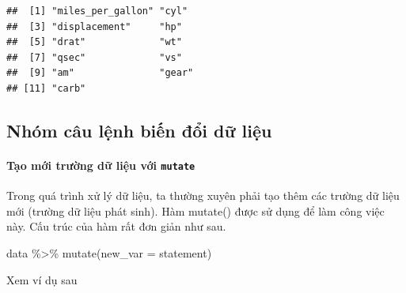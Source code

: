 \documentclass[]{krantz}
\makeatletter
\newenvironment{Shaded}{\begin{snugshade}}{\end{snugshade}}
\newcommand{\DataTypeTok}[1]{\textcolor[rgb]{0.27,0.27,0.27}{#1}}
\newcommand{\DecValTok}[1]{\textcolor[rgb]{0.06,0.06,0.06}{#1}}
\newcommand{\KeywordTok}[1]{\textcolor[rgb]{0.27,0.27,0.27}{\textbf{#1}}}
\newcommand{\NormalTok}[1]{#1}
\newcommand{\OperatorTok}[1]{\textcolor[rgb]{0.43,0.43,0.43}{\textbf{#1}}}
\newcommand{\StringTok}[1]{\textcolor[rgb]{0.5,0.5,0.5}{#1}}
\let\oldparagraph\paragraph
\renewcommand{\paragraph}[1]{\oldparagraph{#1}\mbox{}}
\renewenvironment{quote}{\begin{VF}}{\end{VF}}
\newenvironment{kframe}{%
\medskip{}
\setlength{\fboxsep}{.8em}
 \def\at@end@of@kframe{}%
 \ifinner\ifhmode%
  \def\at@end@of@kframe{\end{minipage}}%
  \begin{minipage}{\columnwidth}%
 \fi\fi%
 \def\FrameCommand##1{\hskip\@totalleftmargin \hskip-\fboxsep
 \colorbox{shadecolor}{##1}\hskip-\fboxsep
     \hskip-\linewidth \hskip-\@totalleftmargin \hskip\columnwidth}%
 \MakeFramed {\advance\hsize-\width
   \@totalleftmargin\z@ \linewidth\hsize
   \@setminipage}}%
 {\par\unskip\endMakeFramed%
 \at@end@of@kframe}
\renewenvironment{Shaded}{\begin{kframe}}{\end{kframe}}
\renewenvironment{Shaded}{\begin{snugshade}}{\end{snugshade}}
\renewcommand{\DataTypeTok}[1]{\textcolor[rgb]{0.13,0.29,0.53}{#1}}
\renewcommand{\DecValTok}[1]{\textcolor[rgb]{0.00,0.00,0.81}{#1}}
\renewcommand{\KeywordTok}[1]{\textcolor[rgb]{0.13,0.29,0.53}{\textbf{#1}}}
\renewcommand{\NormalTok}[1]{#1}
\renewcommand{\OperatorTok}[1]{\textcolor[rgb]{0.81,0.36,0.00}{\textbf{#1}}}
\renewcommand{\StringTok}[1]{\textcolor[rgb]{0.31,0.60,0.02}{#1}}
\theoremstyle{definition}
\theoremstyle{definition}
\theoremstyle{definition}
\theoremstyle{remark}
\makeatother
\begin{document}
\begin{Shaded}
\end{Shaded}

\begin{verbatim}
##  [1] "miles_per_gallon" "cyl"             
##  [3] "displacement"     "hp"              
##  [5] "drat"             "wt"              
##  [7] "qsec"             "vs"              
##  [9] "am"               "gear"            
## [11] "carb"
\end{verbatim}

\hypertarget{nhom-cau-lnh-bin-i-d-liu}{%
\subsection{Nhóm câu lệnh biến đổi dữ
liệu}\label{nhom-cau-lnh-bin-i-d-liu}}

\hypertarget{tao-mi-trung-d-liu-vi-mutate}{%
\paragraph{\texorpdfstring{Tạo mới trường dữ liệu với
\texttt{mutate}}{Tạo mới trường dữ liệu với mutate}}\label{tao-mi-trung-d-liu-vi-mutate}}

Trong quá trình xử lý dữ liệu, ta thường xuyên phải tạo thêm các trường
dữ liệu mới (trường dữ liệu phát sinh). Hàm mutate() được sử dụng để làm
công việc này. Cấu trúc của hàm rất đơn giản như sau.

\begin{quote}
data \%\textgreater{}\% mutate(new\_var = statement)
\end{quote}

Xem ví dụ sau

\begin{Shaded}
\end{Shaded}
\end{document}
